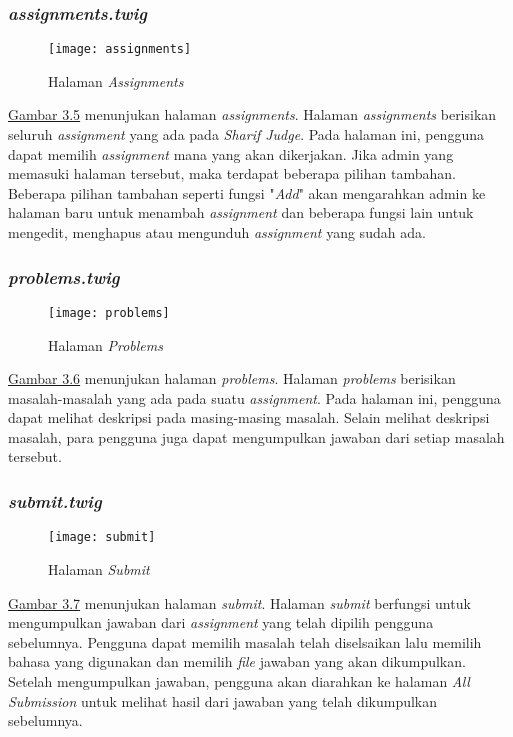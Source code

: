 \subsubsection{\textit{assignments.twig}}
\begin{figure}[H]
	\centering  
	\texttt{[image: assignments]}  
	\caption[Halaman \textit{Assignments}]{Halaman \textit{Assignments}} 
	\label{fig:assignments} 
\end{figure} 
\hyperref[fig:assignments]{Gambar 3.5} menunjukan halaman \textit{assignments}. Halaman \textit{assignments} berisikan seluruh \textit{assignment} yang ada pada \textit{Sharif Judge}. Pada halaman ini, pengguna dapat memilih \textit{assignment} mana yang akan dikerjakan. Jika admin yang memasuki halaman tersebut, maka terdapat beberapa pilihan tambahan. Beberapa pilihan tambahan seperti fungsi "\textit{Add}" akan mengarahkan admin ke halaman baru untuk menambah \textit{assignment} dan beberapa fungsi lain untuk mengedit, menghapus atau mengunduh \textit{assignment} yang sudah ada.

\subsubsection{\textit{problems.twig}}
\begin{figure}[H]
	\centering  
	\texttt{[image: problems]}  
	\caption[Halaman \textit{Problems}]{Halaman \textit{Problems}} 
	\label{fig:problems} 
\end{figure} 
\hyperref[fig:problems]{Gambar 3.6} menunjukan halaman \textit{problems}. Halaman \textit{problems} berisikan masalah-masalah yang ada pada suatu \textit{assignment}. Pada halaman ini, pengguna dapat melihat deskripsi pada masing-masing masalah. Selain melihat deskripsi masalah, para pengguna juga dapat mengumpulkan jawaban dari setiap masalah tersebut.

\subsubsection{\textit{submit.twig}}
\begin{figure}[H]
	\centering  
	\texttt{[image: submit]}  
	\caption[Halaman \textit{Submit}]{Halaman \textit{Submit}} 
	\label{fig:submit} 
\end{figure} 
\hyperref[fig:submit]{Gambar 3.7} menunjukan halaman \textit{submit}. Halaman \textit{submit} berfungsi untuk mengumpulkan jawaban dari \textit{assignment} yang telah dipilih pengguna sebelumnya. Pengguna dapat memilih masalah telah diselsaikan lalu memilih bahasa yang digunakan dan memilih \textit{file} jawaban yang akan dikumpulkan. Setelah mengumpulkan jawaban, pengguna akan diarahkan ke halaman \textit{All Submission} untuk melihat hasil dari jawaban yang telah dikumpulkan sebelumnya.

